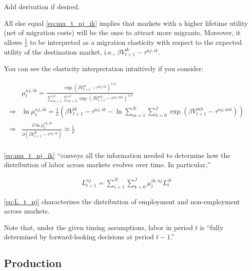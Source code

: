 \documentclass[10pt]{article}
\begin{document}
\begin{questions}[To-do]
    Add derivation if desired.
\end{questions}

All else equal \eqref{eq:mu_t_nj_ik}
implies that markets with a higher lifetime 
utility (net of migration costs) will be the ones to attract more migrants.
Moreover, it allows $\frac{1}{\nu}$ to be interpreted as a migration 
elasticity with respect to the expected utility of the destination market,
i.e., $\beta V_{t+1}^{i k}-\tau^{n j, i k}$.

You can see the elasticity interpretation intuitively if you consider:

\begin{align}
    &\mu_t^{n j, i k}=\frac{\exp \left(\beta V_{t+1}^{i k}-\tau^{n j, i k}\right)^{1 / \nu}}{\sum_{m=1}^N \sum_{h=0}^J \exp \left(\beta V_{t+1}^{m h}-\tau^{n j, m h}\right)^{1 / \nu}} \\
    \Rightarrow &\ln \mu_t^{n j, i k} = \frac{1}{\nu} \left( \beta V_{t+1}^{i k}-\tau^{n j, i k} - \ln \sum_{m=1}^N \sum_{h=0}^J \exp \left(\beta V_{t+1}^{m h}-\tau^{n j, m h}\right) \right) \\
    \Rightarrow &\frac{\partial \ln \mu_t^{n j, i k}}{\partial (\beta V_{t+1}^{i k} - \tau^{n j, i k})} \approx \frac{1}{\nu} \\
\end{align}

\eqref{eq:mu_t_nj_ik} ``conveys all the 
information needed to determine how the distribution of 
labor across markets evolves over time. In particular,''

\begin{align}
    L_{t+1}^{n j}=\sum_{i=1}^N \sum_{k=0}^J \mu_t^{i k, n j} L_t^{i k} \label{eq:L_t_nj}
\end{align}

\eqref{eq:L_t_nj} characterizes the distribution of 
employment and non-employment across markets. 

Note that, under the given timing assumptions, 
labor in period $t$ is ``fully determined by 
forward-looking decisions at period $t-1$.''

\subsection{Production}
\end{document}
